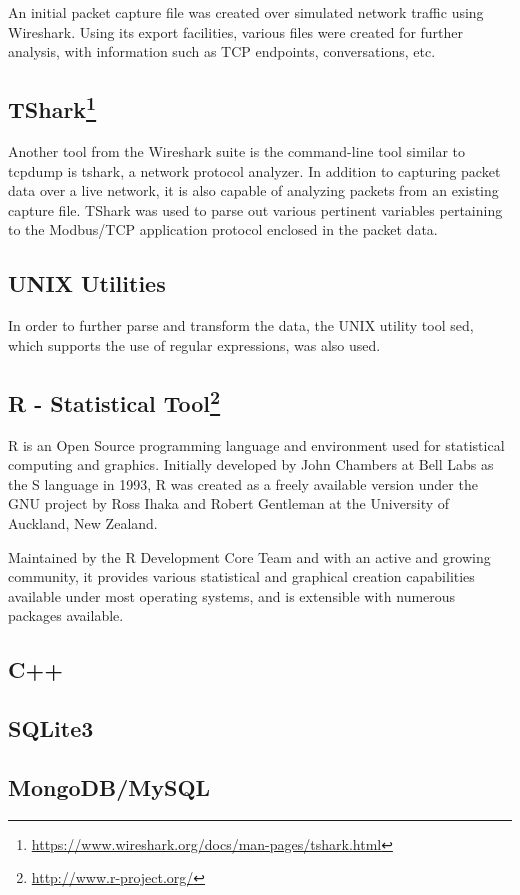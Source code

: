 \documentclass[12pt,]{article}
\begin{document}
An initial packet capture file was created over simulated network
traffic using Wireshark. Using its export facilities, various files were
created for further analysis, with information such as TCP endpoints,
conversations, etc.

\subsection[TShark]{TShark\footnote{\url{https://www.wireshark.org/docs/man-pages/tshark.html}}}\label{tshark3}

Another tool from the Wireshark suite is the command-line tool similar
to tcpdump is tshark, a network protocol analyzer. In addition to
capturing packet data over a live network, it is also capable of
analyzing packets from an existing capture file. TShark was used to
parse out various pertinent variables pertaining to the Modbus/TCP
application protocol enclosed in the packet data.

\subsection{UNIX Utilities}\label{unix-utilities}

In order to further parse and transform the data, the UNIX utility tool
sed, which supports the use of regular expressions, was also used.

\subsection[R - Statistical Tool]{R - Statistical Tool\footnote{\url{http://www.r-project.org/}}}\label{r---statistical-tool4}

R is an Open Source programming language and environment used for
statistical computing and graphics. Initially developed by John Chambers
at Bell Labs as the S language in 1993, R was created as a freely
available version under the GNU project by Ross Ihaka and Robert
Gentleman at the University of Auckland, New Zealand.

Maintained by the R Development Core Team and with an active and growing
community, it provides various statistical and graphical creation
capabilities available under most operating systems, and is extensible
with numerous packages available.

\subsection{C++}\label{c}

\subsection{SQLite3}\label{sqlite3}

\subsection{MongoDB/MySQL}\label{mongodbmysql}
\end{document}

